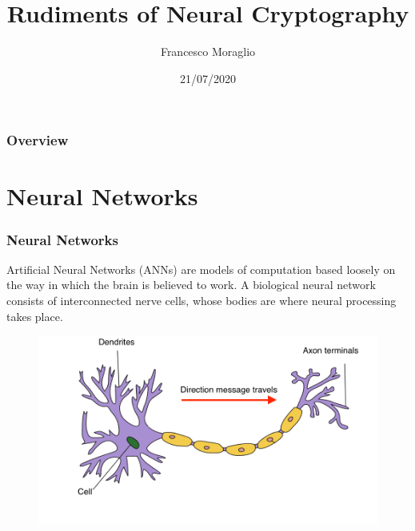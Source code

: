 \documentclass{beamer}
\title[Rudiments of N. C.]{Rudiments of Neural Cryptography} %
\author{Francesco Moraglio} %
\institute[UniTO] %
{
University of Torino \\ %
\medskip
}
\date{21/07/2020} %
\begin{document}
\begin{frame}
\titlepage %
\end{frame}

\begin{frame}
\frametitle{Overview} %
\tableofcontents %
\end{frame}


\section{Neural Networks} %



\begin{frame}
\frametitle{Neural Networks}
Artificial Neural Networks (ANNs) are models of computation based loosely on the way in which the brain is believed to work. A biological neural network consists of interconnected nerve cells, whose bodies are where neural processing takes place. \\
\begin{figure}
\centering
\includegraphics[width = \textwidth]{"pictures/neuron.png"}
\end{figure}

\end{frame}
\end{document}
